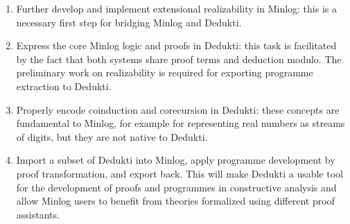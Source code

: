 
\begin{enumerate}
\item Further develop and implement extensional realizability in Minlog: this is
  a necessary first step for bridging Minlog and Dedukti.
\item Express the core Minlog logic and proofs in Dedukti: this task is
  facilitated by the fact that both systems share proof terms and deduction
  modulo. The preliminary work on realizability is required for exporting
  programme extraction to Dedukti.
\item Properly encode coinduction and corecursion in Dedukti: these concepts are
  fundamental to Minlog, for example for representing real numbers as streams of
  digits, but they are not native to Dedukti.
\item Import a subset of Dedukti into Minlog, apply programme development by proof
  transformation, and export back. This will make Dedukti a usable tool for the
  development of proofs and programmes in constructive analysis and allow Minlog
  users to benefit from theories formalized using different proof assistants.
\end{enumerate}




